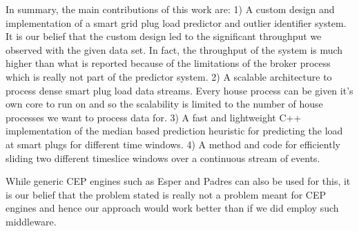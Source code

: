 
In summary, the main contributions of this work are:
1) A custom design and implementation of a smart grid plug load predictor and outlier identifier system.
It is our belief that the custom design led to the significant throughput we observed with the given data set.
In fact, the throughput of the system is much higher than what is reported because of the limitations of the broker process which is really not part of the predictor system.
2) A scalable architecture to process dense smart plug load data streams.
Every house process can be given it's own core to run on and so the scalability is limited to the number of house processes we want to process data for.
3) A fast and lightweight C++ implementation of the median based prediction heuristic for predicting the load at smart plugs for different time windows.
4) A method and code for efficiently sliding two different timeslice windows over a continuous stream of events.

While generic CEP engines such as Esper and Padres can also be used for this, it is our belief that the problem stated is really not a problem meant for CEP engines and hence our approach would work better than if we did employ such middleware.

